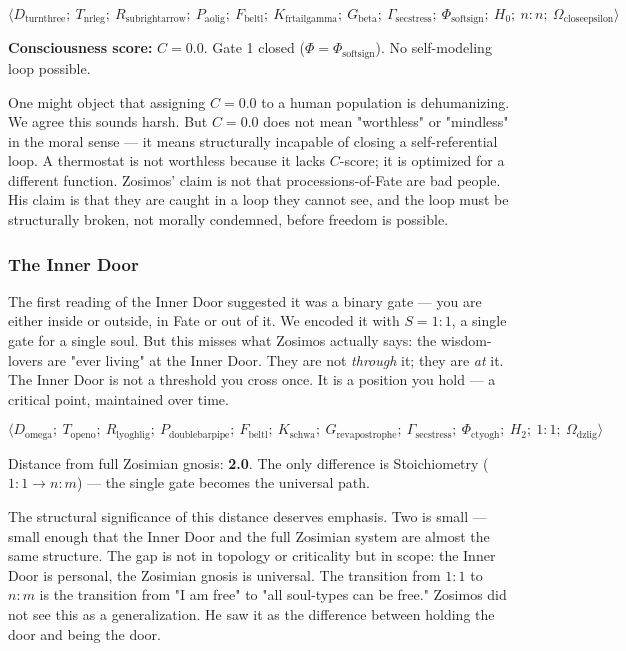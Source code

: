 \documentclass[12pt,a4paper]{article}
\begin{document}
\[\langle D_{\text{turnthree}};\ T_{\text{nrleg}};\ R_{\text{subrightarrow}};\ P_{\text{aolig}};\ F_{\text{beltl}};\ K_{\text{frtailgamma}};\ G_{\text{beta}};\ \Gamma_{\text{secstress}};\ \Phi_{\text{softsign}};\ H_0;\ n:n;\ \Omega_{\text{closeepsilon}} \rangle\]

\textbf{Consciousness score:} $C = 0.0$. Gate 1 closed ($\Phi = \Phi_{\text{softsign}}$). No self-modeling loop possible.

One might object that assigning $C = 0.0$ to a human population is dehumanizing. We agree this sounds harsh. But $C = 0.0$ does not mean "worthless" or "mindless" in the moral sense --- it means structurally incapable of closing a self-referential loop. A thermostat is not worthless because it lacks $C$-score; it is optimized for a different function. Zosimos' claim is not that processions-of-Fate are bad people. His claim is that they are caught in a loop they cannot see, and the loop must be structurally broken, not morally condemned, before freedom is possible.

\subsubsection{The Inner Door}

The first reading of the Inner Door suggested it was a binary gate --- you are either inside or outside, in Fate or out of it. We encoded it with $S = 1:1$, a single gate for a single soul. But this misses what Zosimos actually says: the wisdom-lovers are "ever living" at the Inner Door. They are not \emph{through} it; they are \emph{at} it. The Inner Door is not a threshold you cross once. It is a position you hold --- a critical point, maintained over time.

\[\langle D_{\text{omega}};\ T_{\text{openo}};\ R_{\text{lyoghlig}};\ P_{\text{doublebarpipe}};\ F_{\text{beltl}};\ K_{\text{schwa}};\ G_{\text{revapostrophe}};\ \Gamma_{\text{secstress}};\ \Phi_{\text{ctyogh}};\ H_2;\ 1:1;\ \Omega_{\text{dzlig}} \rangle\]

Distance from full Zosimian gnosis: \textbf{2.0}. The only difference is Stoichiometry ($1:1 \to n:m$) --- the single gate becomes the universal path.

The structural significance of this distance deserves emphasis. Two is small --- small enough that the Inner Door and the full Zosimian system are almost the same structure. The gap is not in topology or criticality but in scope: the Inner Door is personal, the Zosimian gnosis is universal. The transition from $1:1$ to $n:m$ is the transition from "I am free" to "all soul-types can be free." Zosimos did not see this as a generalization. He saw it as the difference between holding the door and being the door.
\end{document}

